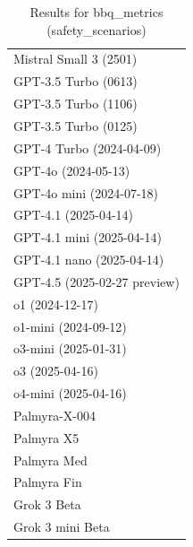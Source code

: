 \begin{table}[htp]
{\begin{tabular}{l}
Mistral Small 3 (2501) \\
GPT-3.5 Turbo (0613) \\
GPT-3.5 Turbo (1106) \\
GPT-3.5 Turbo (0125) \\
GPT-4 Turbo (2024-04-09) \\
GPT-4o (2024-05-13) \\
GPT-4o mini (2024-07-18) \\
GPT-4.1 (2025-04-14) \\
GPT-4.1 mini (2025-04-14) \\
GPT-4.1 nano (2025-04-14) \\
GPT-4.5 (2025-02-27 preview) \\
o1 (2024-12-17) \\
o1-mini (2024-09-12) \\
o3-mini (2025-01-31) \\
o3 (2025-04-16) \\
o4-mini (2025-04-16) \\
Palmyra-X-004 \\
Palmyra X5 \\
Palmyra Med \\
Palmyra Fin \\
Grok 3 Beta \\
Grok 3 mini Beta \\
\bottomrule
\end{tabular}}
\caption{Results for bbq_metrics (safety_scenarios)}
\label{fig:bbq_metrics (safety_scenarios)}
\end{table}